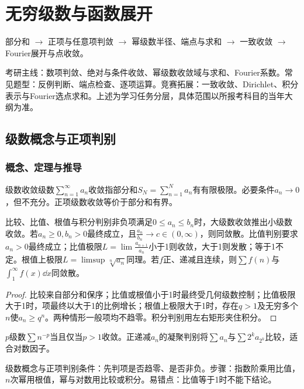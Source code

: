 \chapter{无穷级数与函数展开}\label{ch:9}
\begin{tcolorbox}[title=章首知识地图,colframe=Ink]
部分和 $\to$ 正项与任意项判敛 $\to$ 幂级数半径、端点与求和 $\to$ 一致收敛 $\to$ Fourier展开与点收敛。
\end{tcolorbox}
\begin{examtip}考研主线：数项判敛、绝对与条件收敛、幂级数收敛域与求和、Fourier系数。常见题型：反例判断、端点检查、逐项运算。竞赛拓展：一致收敛、Dirichlet、积分表示与Fourier选点求和。上述为学习任务分层，具体范围以所报考科目的当年大纲为准。\end{examtip}
\section{级数概念与正项判别}\label{sec:9:1}
\subsection{概念、定理与推导}

\begin{definition}{级数收敛}级数$\sum_{n=1}^\infty a_n$收敛指部分和$S_N=\sum_{n=1}^Na_n$有有限极限。必要条件$a_n\to0$，但不充分。正项级数收敛等价于部分和有界。\end{definition}
\begin{theorem}{比较、比值、根值与积分判别}非负项满足$0\le a_n\le b_n$时，大级数收敛推出小级数收敛。若$a_n\ge0,b_n>0$最终成立，且$\frac{a_n}{b_n}\to c\in(0,\infty)$，则同敛散。比值判别要求$a_n>0$最终成立；比值极限$L=\lim \frac{a_{n+1}}{a_n}$小于1则收敛，大于1则发散；等于1不定。根值上极限$L=\limsup\sqrt[n]{a_n}$同理。若$f$正、递减且连续，则$\sum f(n)$与$\int_1^\infty f(x)\dd x$同敛散。\end{theorem}
\begin{proof}比较来自部分和保序；比值或根值小于1时最终受几何级数控制；比值极限大于1时，项最终以大于1的比例增长；根值上极限大于1时，存在$q>1$及无穷多个$n$使$a_n\ge q^n$。两种情形一般项均不趋零。积分判别用左右矩形夹住积分。\end{proof}
$p$级数$\sum n^{-p}$当且仅当$p>1$收敛。正递减$a_n$的凝聚判别将$\sum a_n$与$\sum2^ka_{2^k}$比较，适合对数因子。

\begin{method}{级数概念与正项判别}条件：先判项是否趋零、是否非负。步骤：指数阶乘用比值，$n$次幂用根值，幂与对数用比较或积分。易错点：比值等于1时不能下结论。\end{method}
